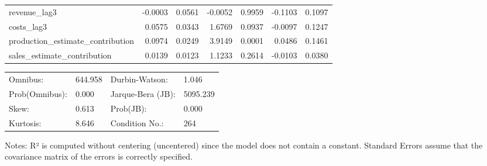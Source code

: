 \begin{table}
\begin{center}
\begin{tabular}{lrrrrrr}
revenue\_lag3                      & -0.0003 &   0.0561 & -0.0052 &      0.9959 & -0.1103 &  0.1097  \\
costs\_lag3                        &  0.0575 &   0.0343 &  1.6769 &      0.0937 & -0.0097 &  0.1247  \\
production\_estimate\_contribution &  0.0974 &   0.0249 &  3.9149 &      0.0001 &  0.0486 &  0.1461  \\
sales\_estimate\_contribution      &  0.0139 &   0.0123 &  1.1233 &      0.2614 & -0.0103 &  0.0380  \\
\hline
\end{tabular}
\end{center}

\begin{center}
\begin{tabular}{llll}
\hline
Omnibus:       & 644.958 & Durbin-Watson:    & 1.046     \\
Prob(Omnibus): & 0.000   & Jarque-Bera (JB): & 5095.239  \\
Skew:          & 0.613   & Prob(JB):         & 0.000     \\
Kurtosis:      & 8.646   & Condition No.:    & 264       \\
\hline
\end{tabular}
\end{center}
\end{table}
\bigskip
Notes: \newline 
[1] R² is computed without centering (uncentered) since the                 model does not contain a constant. \newline 
[2] Standard Errors assume that the covariance matrix of the errors is correctly specified.